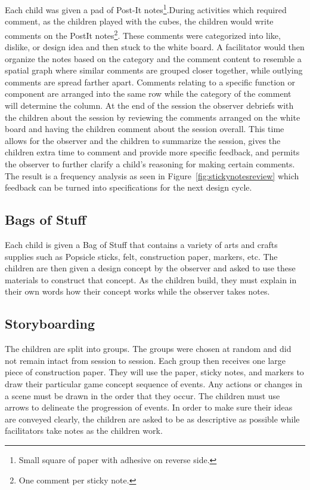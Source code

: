 Each child was given a pad of Post-It notes\footnote{Small square of paper with adhesive on reverse side.}.During activities which required comment, as the children played with the cubes, the children would write comments on the PostIt notes\footnote{One comment per sticky note.}. These comments were categorized into like, dislike, or design idea and then stuck to the white board. A facilitator would then organize the notes based on the category and the comment content to resemble a spatial graph where similar comments are grouped closer together, while outlying comments are spread farther apart. Comments relating to a specific function or component are arranged into the same row while the category of the comment will determine the column. At the end of the session the observer debriefs with the children about the session by reviewing the comments arranged on the white board and having the children comment about the session overall. This time allows for the observer and the children to summarize the session, gives the children extra time to comment and provide more specific feedback, and permits the observer to further clarify a child's reasoning for making certain comments. The result is a frequency analysis as seen in Figure~\ref{fig:stickynotesreview} which feedback can be turned into specifications for the next design cycle.  \cite{Druin:1999:CID:302979.303166}\cite{Druin02therole} 

\subsection{Bags of Stuff} \label{sec:bagsofstuff}
Each child is given a Bag of Stuff that contains a variety of arts and crafts supplies such as Popsicle sticks, felt, construction paper, markers, etc. The children are then given a design concept by the observer and asked to use these materials to construct that concept. As the children build, they must explain in their own words how their concept works while the observer takes notes. \cite{Druin:1999:CID:302979.303166}\cite{Druin02therole}

\subsection{Storyboarding}\label{sec:storyboarding}

The children are split into groups. The groups were chosen at random and did not remain intact from session to session. Each group then receives one large piece of construction paper. They will use the paper, sticky notes, and markers to draw their particular game concept sequence of events. Any actions or changes in a scene must be drawn in the order that they occur. The children must use arrows to delineate the progression of events. In order to make sure their ideas are conveyed clearly, the children are asked to be as descriptive as possible while facilitators take notes as the children work. \cite{Druin:1999:CID:302979.303166}\cite{Druin02therole}

